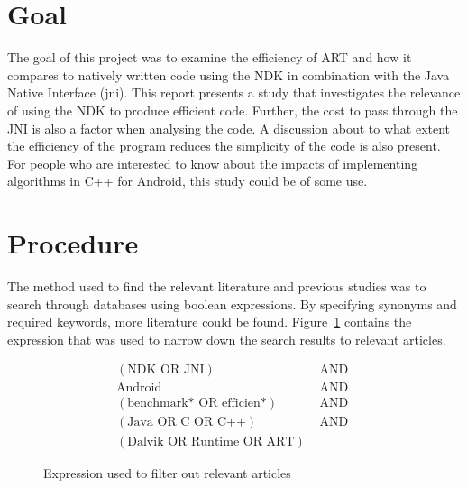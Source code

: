 \section{Goal}
The goal of this project was to examine the efficiency of ART and how it compares to natively written code using the NDK in combination with the Java Native Interface (\gls{jni}). This report presents a study that investigates the relevance of using the NDK to produce efficient code. Further, the cost to pass through the JNI is also a factor when analysing the code. A discussion about to what extent the efficiency of the program reduces the simplicity of the code is also present. For people who are interested to know about the impacts of implementing algorithms in C++ for Android, this study could be of some use.

\section{Procedure}

The method used to find the relevant literature and previous studies was to search through databases using boolean expressions. By specifying synonyms and required keywords, more literature could be found. Figure~\ref{fig:db:search} contains the expression that was used to narrow down the search results to relevant articles.%

\begin{figure}[H]
    \centering
    \begin{align*}
        (\text{NDK OR JNI})               & \text{ AND } \\
        \text{Android}                    & \text{ AND } \\
        (\text{benchmark* OR efficien*})  & \text{ AND } \\
        (\text{Java OR C OR C++})         & \text{ AND } \\
        (\text{Dalvik OR Runtime OR ART}) &
    \end{align*}
    \caption{Expression used to filter out relevant articles}
    \label{fig:db:search}
\end{figure}

